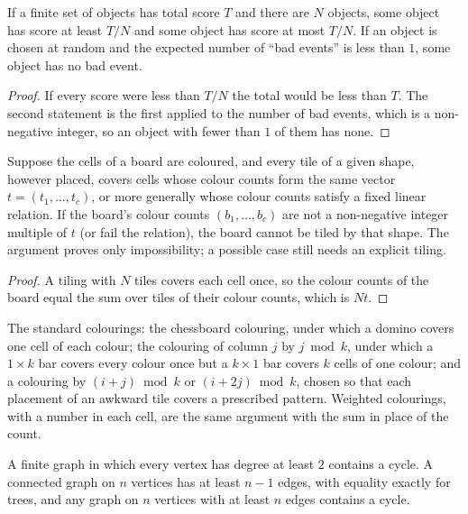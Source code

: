 \begin{theorem}
If a finite set of objects has total score $T$ and there are $N$ objects, some object has score at least $T/N$ and some object has score at most $T/N$. If an object is chosen at random and the expected number of ``bad events'' is less than $1$, some object has no bad event.
\end{theorem}

\begin{proof}
If every score were less than $T/N$ the total would be less than $T$. The second statement is the first applied to the number of bad events, which is a non-negative integer, so an object with fewer than $1$ of them has none.
\end{proof}

\begin{proposition}
Suppose the cells of a board are coloured, and every tile of a given shape, however placed, covers cells whose colour counts form the same vector $t=(t_1,\dots,t_c)$, or more generally whose colour counts satisfy a fixed linear relation. If the board's colour counts $(b_1,\dots,b_c)$ are not a non-negative integer multiple of $t$ (or fail the relation), the board cannot be tiled by that shape. The argument proves only impossibility; a possible case still needs an explicit tiling.
\end{proposition}

\begin{proof}
A tiling with $N$ tiles covers each cell once, so the colour counts of the board equal the sum over tiles of their colour counts, which is $Nt$.
\end{proof}

The standard colourings: the chessboard colouring, under which a domino covers one cell of each colour; the colouring of column $j$ by $j\bmod k$, under which a $1\times k$ bar covers every colour once but a $k\times 1$ bar covers $k$ cells of one colour; and a colouring by $(i+j)\bmod k$ or $(i+2j)\bmod k$, chosen so that each placement of an awkward tile covers a prescribed pattern. Weighted colourings, with a number in each cell, are the same argument with the sum in place of the count.

\begin{lemma}[Cycles]
A finite graph in which every vertex has degree at least $2$ contains a cycle. A connected graph on $n$ vertices has at least $n-1$ edges, with equality exactly for trees, and any graph on $n$ vertices with at least $n$ edges contains a cycle.
\end{lemma}

